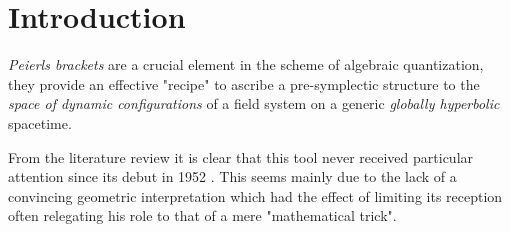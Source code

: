 \documentclass[Main]{subfiles}
\begin{document}
\chapter*{Introduction}

\emph{Peierls brackets} are a crucial element in the scheme of algebraic quantization,
they provide an effective "recipe" to ascribe a pre-symplectic structure to the \emph{space of dynamic configurations} of a field system on a generic \emph{globally hyperbolic} spacetime.

From the literature review it is clear that this tool never received particular attention since its debut in 1952 \cite{Peierls1952}.
This seems mainly due to the lack of a convincing geometric interpretation
which had the effect of limiting its reception often relegating his role to that of a mere  "mathematical trick".
\end{document}
